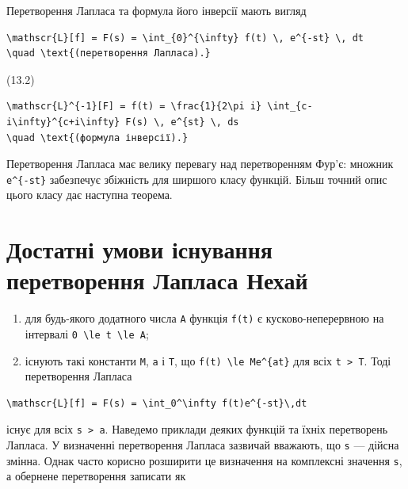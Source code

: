 \documentclass[
  ukrainian,
]{article}
\providecommand{\tightlist}{%
  \setlength{\itemsep}{0pt}\setlength{\parskip}{0pt}}
\begin{document}
Перетворення Лапласа та формула його інверсії мають вигляд

\begin{verbatim}
\mathscr{L}[f] = F(s) = \int_{0}^{\infty} f(t) \, e^{-st} \, dt
\quad \text{(перетворення Лапласа).}
\end{verbatim}

(13.2)

\begin{verbatim}
\mathscr{L}^{-1}[F] = f(t) = \frac{1}{2\pi i} \int_{c-i\infty}^{c+i\infty} F(s) \, e^{st} \, ds
\quad \text{(формула інверсії).}
\end{verbatim}

Перетворення Лапласа має велику перевагу над перетворенням Фур'є:
множник \texttt{e\^{}\{-st\}} забезпечує збіжність для ширшого класу
функцій. Більш точний опис цього класу дає наступна теорема.

\section{Достатні умови існування перетворення Лапласа
Нехай}\label{ux434ux43eux441ux442ux430ux442ux43dux456-ux443ux43cux43eux432ux438-ux456ux441ux43dux443ux432ux430ux43dux43dux44f-ux43fux435ux440ux435ux442ux432ux43eux440ux435ux43dux43dux44f-ux43bux430ux43fux43bux430ux441ux430-ux43dux435ux445ux430ux439}

\begin{enumerate}
\def\labelenumi{\arabic{enumi}.}
\tightlist
\item
  для будь-якого додатного числа \texttt{A} функція \texttt{f(t)} є
  кусково-неперервною на інтервалі
  \texttt{0\ \textbackslash{}le\ t\ \textbackslash{}le\ A};
\item
  існують такі константи \texttt{M}, \texttt{a} і \texttt{T}, що
  \texttt{\textbar{}f(t)\textbar{}\ \textbackslash{}le\ Me\^{}\{at\}}
  для всіх \texttt{t\ \textgreater{}\ T}. Тоді перетворення Лапласа
\end{enumerate}

\begin{verbatim}
\mathscr{L}[f] = F(s) = \int_0^\infty f(t)e^{-st}\,dt
\end{verbatim}

існує для всіх \texttt{s\ \textgreater{}\ a}. Наведемо приклади деяких
функцій та їхніх перетворень Лапласа. У визначенні перетворення Лапласа
зазвичай вважають, що \texttt{s} --- дійсна змінна. Однак часто корисно
розширити це визначення на комплексні значення \texttt{s}, а обернене
перетворення записати як
\end{document}
